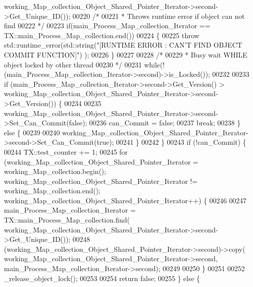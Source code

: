 \begin{DoxyCode}
      working\_Map\_collection\_Object\_Shared\_Pointer\_Iterator->second->Get\_Unique\_ID());
00220             \textcolor{comment}{/*}
00221 \textcolor{comment}{             * Throws runtime error if object can not find}
00222 \textcolor{comment}{             */}
00223             \textcolor{keywordflow}{if}(main\_Process\_Map\_collection\_Iterator == TX::main\_Process\_Map\_collection.end())
00224             \{
00225                 \textcolor{keywordflow}{throw} std::runtime\_error(std::string(\textcolor{stringliteral}{"[RUNTIME ERROR : CAN'T FIND OBJECT COMMIT FUNCTION]"})
      );
00226             \}
00227 
00228         \textcolor{comment}{/*}
00229 \textcolor{comment}{         * Busy wait WHILE object locked by other thread}
00230 \textcolor{comment}{         */}
00231         \textcolor{keywordflow}{while}(!(main\_Process\_Map\_collection\_Iterator->second)->is\_Locked());
00232 
00233         \textcolor{keywordflow}{if} (main\_Process\_Map\_collection\_Iterator->second->Get\_Version() > 
      working\_Map\_collection\_Object\_Shared\_Pointer\_Iterator->second->Get\_Version()) \{
00234 
00235             working\_Map\_collection\_Object\_Shared\_Pointer\_Iterator->second->Set\_Can\_Commit(\textcolor{keyword}{false});
00236             can\_Commit = \textcolor{keyword}{false};
00237             \textcolor{keywordflow}{break};
00238         \} \textcolor{keywordflow}{else} \{
00239 
00240             working\_Map\_collection\_Object\_Shared\_Pointer\_Iterator->second->Set\_Can\_Commit(\textcolor{keyword}{true});
00241         \}
00242     \}
00243     \textcolor{keywordflow}{if} (!can\_Commit) \{
00244         TX::test\_counter += 1;
00245         \textcolor{keywordflow}{for} (working\_Map\_collection\_Object\_Shared\_Pointer\_Iterator = working\_Map\_collection.begin(); 
      working\_Map\_collection\_Object\_Shared\_Pointer\_Iterator != working\_Map\_collection.end(); 
      working\_Map\_collection\_Object\_Shared\_Pointer\_Iterator++) \{
00246           
00247             main\_Process\_Map\_collection\_Iterator  = TX::main\_Process\_Map\_collection.find(
      working\_Map\_collection\_Object\_Shared\_Pointer\_Iterator->second->Get\_Unique\_ID());
00248             (working\_Map\_collection\_Object\_Shared\_Pointer\_Iterator->second)->copy(
      working\_Map\_collection\_Object\_Shared\_Pointer\_Iterator->second, main\_Process\_Map\_collection\_Iterator->second);
00249 
00250         \}
00251         
00252         \_release\_object\_lock();
00253 
00254         \textcolor{keywordflow}{return} \textcolor{keyword}{false};
00255     \} \textcolor{keywordflow}{else} \{

\end{DoxyCode}
